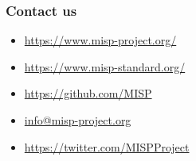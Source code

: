 \begin{frame}
  \frametitle{Contact us}
  \begin{itemize}
    \item \url{https://www.misp-project.org/}
    \item \url{https://www.misp-standard.org/}
    \item \url{https://github.com/MISP}
    \item \url{info@misp-project.org}
    \item \url{https://twitter.com/MISPProject}
  \end{itemize}
\end{frame}


